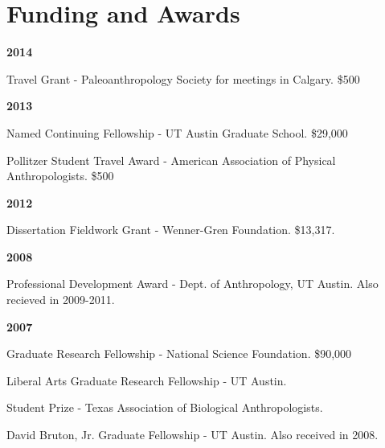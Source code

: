 \documentclass{article}
\begin{document}
\section*{Funding and Awards}

\begin{description*}
\item[] {\bfseries 2014}
\item[] Travel Grant - Paleoanthropology Society for meetings in Calgary. \$500
\end{description*}


\begin{description*}
\item[] {\bfseries 2013}
\item[] Named Continuing Fellowship - UT Austin Graduate School. \$29,000
\item[] Pollitzer Student Travel Award - American Association of Physical Anthropologists. \$500
\end{description*}


\begin{description*}
\item[] {\bfseries 2012}
\item[] Dissertation Fieldwork Grant - Wenner-Gren Foundation. \$13,317.
\end{description*}

\newpage
\begin{description*}
\item[] {\bfseries 2008}
\item[] Professional Development Award - Dept. of Anthropology, UT Austin. Also recieved in 2009-2011.
\end{description*}

\begin{description*}
\item[] {\bfseries 2007}
\item[] Graduate Research Fellowship - National Science Foundation. \$90,000

\item[] Liberal Arts Graduate Research Fellowship - UT Austin.

\item[] Student Prize - Texas Association of Biological Anthropologists.

\item[] David Bruton, Jr. Graduate Fellowship - UT Austin. Also received in 2008.
\end{description*}
\end{document}
